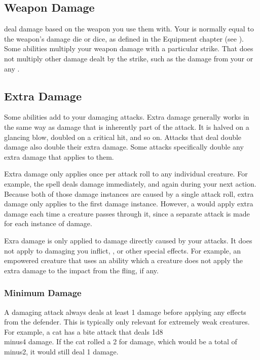   \subsection{Weapon Damage}\label{Weapon Damage}
     deal damage based on the weapon you use them with.
    Your  is normally equal to the weapon's damage die or dice, as defined in the Equipment chapter (see ).
    Some abilities multiply your weapon damage with a particular strike.
    That does not multiply other damage dealt by the strike, such as the damage from your  or any .

  \subsection{Extra Damage}\label{Extra Damage}
    Some abilities add  to your damaging attacks.
    Extra damage generally works in the same way as damage that is inherently part of the attack.
    It is halved on a glancing blow, doubled on a critical hit, and so on.
    Attacks that deal double damage also double their extra damage.
    Some attacks specifically double any extra damage that applies to them.

    Extra damage only applies once per attack roll to any individual creature.
    For example, the  spell deals damage immediately, and again during your next action.
    Because both of those damage instances are caused by a single attack roll, extra damage only applies to the first damage instance.
    However, a  would apply extra damage each time a creature passes through it, since a separate attack is made for each instance of damage.

    Exra damage is only applied to damage directly caused by your attacks.
    It does not apply to damaging  you inflict, , or other special effects.
    For example, an empowered creature that uses an ability which  a creature does not apply the extra damage to the impact from the fling, if any.

  \subsubsection{Minimum Damage}
    A damaging attack always deals at least 1 damage before applying any effects from the defender.
    This is typically only relevant for extremely weak creatures.
    For example, a cat has a bite attack that deals 1d8\\minus4 damage.
    If the cat rolled a 2 for damage, which would be a total of \\minus2, it would still deal 1 damage.


